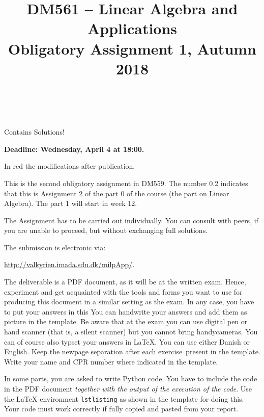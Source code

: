 \documentclass[a4paper,10pt]{article}
\title{%
\begin{flushleft}
DM561 -- Linear Algebra and Applications\\[0.3cm]
{\Large Obligatory Assignment 1, Autumn 2018} %
\\
\hrulefill
\\[-1.8cm]
\end{flushleft}
}
\author{}
\date{}
\begin{document}
\maketitle



\begin{solution}
Contains Solutions!
\end{solution}



\begin{center}
\color{red}
  {\bf Deadline: Wednesday, April 4 at 18:00.}
\color{black}
\end{center}

\color{red}In red the modifications after publication.\color{black}

This is the second obligatory assignment in DM559. The number 0.2
indicates that this is Assignment 2 of the part 0 of the course (the
part on Linear Algebra). The part 1 will start in week 12.

The Assignment has to be carried out individually.  You can consult with
peers, if you are unable to proceed, but without exchanging full
solutions.


The submission is electronic via:
\begin{center}
\url{http://valkyrien.imada.sdu.dk/milpApp/}.
\end{center} 



The deliverable is a PDF document, as it will be at the written
exam. Hence, experiment and get acquainted with the tools and forms you
want to use for producing this document in a similar setting as the
exam. In any case, you have to put your answers in this
 You can
handwrite your answers and add them as picture in the template. Be aware
that at the exam you can use digital pen or hand scanner (that is, a
silent scanner) but you cannot bring handycameras. You can of course
also typset your answers in LaTeX. You can use either Danish or English.
Keep the newpage separation after each
\color{red}exercise\color{black}\ present in the template. Write your
name and CPR number where indicated in the template.

\medskip

In some parts, you are asked to write Python code. You have to include
the code in the PDF document \emph{together with the output of the
  execution of the code}. Use the LaTeX environment \verb=lstlisting=
as shown in the template for doing this. Your code must work correctly
if fully copied and pasted from your report.
%
%
\end{document}
